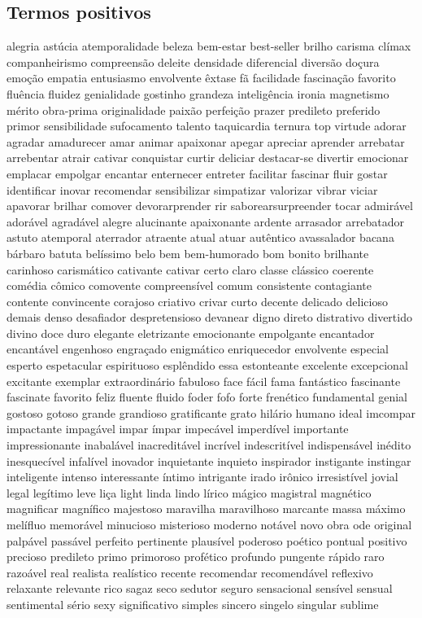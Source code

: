 \documentclass[ruledheader]{abnt_UFF}
\begin{document}
\subsection{Termos positivos}
alegria ast\'{u}cia atemporalidade beleza bem-estar best-seller brilho carisma cl\'{i}max companheirismo compreens\~ao deleite densidade diferencial divers\~ao do\c{c}ura emo\c{c}\~ao empatia entusiasmo envolvente \^{e}xtase f\~a facilidade fascina\c{c}\~ao favorito flu\^{e}ncia fluidez genialidade gostinho grandeza intelig\^{e}ncia ironia magnetismo m\'{e}rito obra-prima originalidade paix\~ao perfei\c{c}\~ao prazer predileto preferido primor sensibilidade sufocamento talento taquicardia ternura top virtude adorar agradar amadurecer amar animar apaixonar apegar apreciar aprender arrebatar arrebentar atrair cativar conquistar curtir deliciar destacar-se divertir emocionar emplacar empolgar encantar enternecer entreter facilitar fascinar fluir gostar identificar inovar recomendar sensibilizar simpatizar valorizar vibrar viciar apavorar brilhar comover devorarprender rir saborearsurpreender tocar admir\'{a}vel ador\'{a}vel agrad\'{a}vel alegre alucinante apaixonante ardente arrasador arrebatador astuto atemporal aterrador atraente atual atuar aut\^{e}ntico avassalador bacana b\'{a}rbaro batuta bel\'{i}ssimo belo bem bem-humorado bom bonito brilhante carinhoso carism\'{a}tico cativante cativar certo claro classe cl\'{a}ssico coerente com\'{e}dia c\^{o}mico comovente compreens\'{i}vel comum consistente contagiante contente convincente corajoso criativo crivar curto decente delicado delicioso demais denso desafiador despretensioso devanear digno direto distrativo divertido divino doce duro elegante eletrizante emocionante empolgante encantador encant\'{a}vel engenhoso engra\c{c}ado enigm\'{a}tico enriquecedor envolvente especial esperto espetacular espirituoso espl\^{e}ndido essa estonteante excelente excepcional excitante exemplar extraordin\'{a}rio fabuloso face f\'{a}cil fama fant\'{a}stico fascinante fascinate favorito feliz fluente fluido foder fofo forte fren\'{e}tico fundamental genial gostoso gotoso grande grandioso gratificante grato hil\'{a}rio humano ideal imcompar impactante impag\'{a}vel impar \'{i}mpar impec\'{a}vel imperd\'{i}vel importante impressionante inabal\'{a}vel inacredit\'{a}vel incr\'{i}vel indescrit\'{i}vel indispens\'{a}vel in\'{e}dito inesquec\'{i}vel infal\'{i}vel inovador inquietante inquieto inspirador instigante instingar inteligente intenso interessante \'{i}ntimo intrigante irado ir\^{o}nico irresist\'{i}vel jovial legal leg\'{i}timo leve li\c{c}a light linda lindo l\'{i}rico m\'{a}gico magistral magn\'{e}tico magnificar magn\'{i}fico majestoso maravilha maravilhoso marcante massa m\'{a}ximo mel\'{i}fluo memor\'{a}vel minucioso misterioso moderno not\'{a}vel novo obra ode original palp\'{a}vel pass\'{a}vel perfeito pertinente plaus\'{i}vel poderoso po\'{e}tico pontual positivo precioso predileto primo primoroso prof\'{e}tico profundo pungente r\'{a}pido raro razo\'{a}vel real realista real\'{i}stico recente recomendar recomend\'{a}vel reflexivo relaxante relevante rico sagaz seco sedutor seguro sensacional sens\'{i}vel sensual sentimental s\'{e}rio sexy significativo simples sincero singelo singular sublime 
\end{document}
